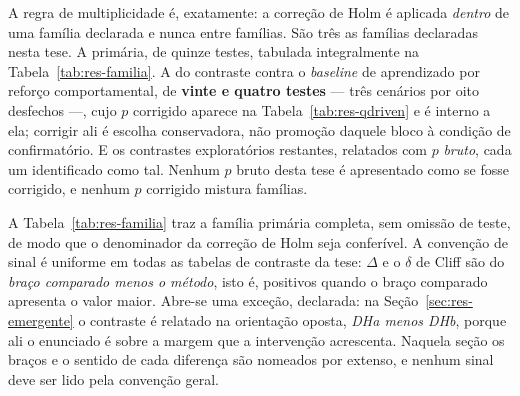 A regra de multiplicidade é, exatamente: a correção de Holm é aplicada \emph{dentro}
de uma família declarada e nunca entre famílias. São três as famílias declaradas nesta
tese. A primária, de quinze testes, tabulada integralmente na
Tabela~\ref{tab:res-familia}. A do contraste contra o \textit{baseline} de
aprendizado por reforço comportamental, de \textbf{vinte e quatro testes} --- três
cenários por oito desfechos ---, cujo $p$ corrigido aparece na
Tabela~\ref{tab:res-qdriven} e é interno a ela; corrigir ali é escolha
conservadora, não promoção daquele bloco à condição de confirmatório. E os contrastes
exploratórios restantes, relatados com $p$ \emph{bruto}, cada um identificado como
tal. Nenhum $p$ bruto desta tese é apresentado como se fosse corrigido, e nenhum $p$
corrigido mistura famílias.

A Tabela~\ref{tab:res-familia} traz a família primária completa, sem omissão de teste,
de modo que o denominador da correção de Holm seja conferível. A convenção de sinal é
uniforme em todas as tabelas de contraste da tese: $\Delta$ e o $\delta$ de Cliff são
do \emph{braço comparado menos o método}, isto é, positivos quando o braço comparado
apresenta o valor maior.
Abre-se uma exceção, declarada: na Seção~\ref{sec:res-emergente} o contraste é
relatado na orientação oposta, \emph{DHa menos DHb}, porque ali o enunciado é sobre a
margem que a intervenção acrescenta. Naquela seção os braços e o sentido de cada
diferença são nomeados por extenso, e nenhum sinal deve ser lido pela convenção geral.

